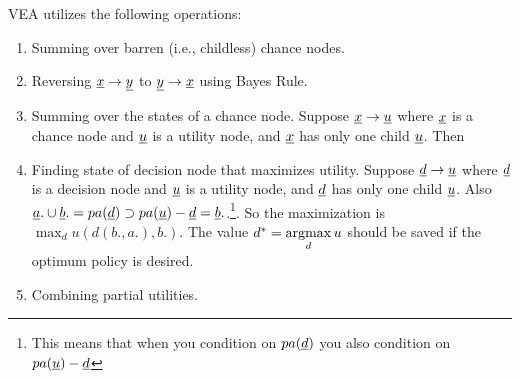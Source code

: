 VEA utilizes the following operations:
\begin{enumerate}
\item Summing over barren (i.e., childless) chance nodes.
\item Reversing ${\underline{x}}\rightarrow {\underline{y}}$
to ${\underline{y}}\rightarrow {\underline{x}}$
using Bayes Rule.
\beq
{}
\eeq

\item Summing over the states of a chance node. Suppose
${\underline{x}}\rightarrow {\underline{u}}$ 
where ${\underline{x}}$ is a chance node and ${\underline{u}}$
is a utility node, and ${\underline{x}}$ has only one child ${\underline{u}}$. Then
\beq
{}
\eeq

\item Finding state of decision node that maximizes utility. 
Suppose ${\underline{d}}\rightarrow {\underline{u}}$ 
where ${\underline{d}}$ is a decision node and ${\underline{u}}$
is a utility node, and ${\underline{d}}$ has only
one child ${\underline{u}}$. Also
${\underline{a}}.\cup{\underline{b}}.=pa({\underline{d}})\supset pa({\underline{u}})-{\underline{d}}={\underline{b}}.$.\footnote{
This means that when you condition on
$pa({\underline{d}})$ you also
condition on $pa({\underline{u}})-{\underline{d}}$}. So the 
maximization is $\max_du (d(b., a.), b.)$.
The value $d^*=\mathop{\mathrm{argmax}}\limits_d u$
should be saved
if the optimum policy is desired.

\beq
{}
\eeq

\item Combining partial
utilities. 
\beq
{}
\eeq
\end{enumerate}

